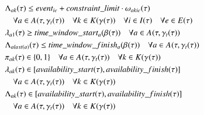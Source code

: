 \begin{alignat}{2}
	& \VarFinishOfSegment{\ElementActivity}{\ElementWorkSegment} \leq \ParEvent + \ParConstraintLimit \cdot \VarSegmentInRelation \notag\\
	& \quad \forall \ElementActivity \in \SetActivity{\VarSupervisorAssignment{}{\ElementTechnician}}{}  \quad\forall \ElementWorkSegment \in \SetWorkSegment                                         \quad \forall i \in \SetTimeInstance  \quad\forall \ElementEvent \in \SetEvent                                                                                                                         \\
	& \VarStartOfSegment{\ElementActivity}{1} \geq \ParTimeWindowStart  \quad \forall \ElementActivity \in \SetActivity{\VarSupervisorAssignment{}{\ElementTechnician}}{}                                                                                                      \\
	& \VarFinishOfSegment{\ElementActivity}{last(\ElementActivity)} \leq \ParTimeWindowFinish  \quad \forall \ElementActivity \in \SetActivity{\VarSupervisorAssignment{}{\ElementTechnician}}{}                                                                                                      \\
	& \VarActiveSegment{\ElementActivity}{\ElementWorkSegment} \in \{0, 1\}  \quad \forall \ElementActivity \in \SetActivity{\VarSupervisorAssignment{}{\ElementTechnician}}{} \quad \forall \ElementWorkSegment \in \SetWorkSegment                                                \\
	& \VarStartOfSegment{\ElementActivity}{\ElementWorkSegment} \in [\ParAvailabilityStart, \ParAvailabilityFinish]                                                                                                           \notag\\
	& \quad \forall \ElementActivity \in \SetActivity{\VarSupervisorAssignment{}{\ElementTechnician}}{} \quad \forall \ElementWorkSegment \in \SetWorkSegment                                                \\
	& \VarFinishOfSegment{\ElementActivity}{\ElementWorkSegment} \in [\ParAvailabilityStart, \ParAvailabilityFinish]                                                                                                             \notag\\
	& \quad \forall \ElementActivity \in \SetActivity{\VarSupervisorAssignment{}{\ElementTechnician}}{} \quad \forall \ElementWorkSegment \in \SetWorkSegment                                                \\

\end{alignat}
